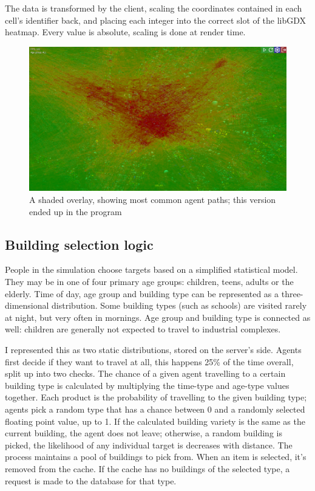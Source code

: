 The data is transformed by the client, scaling the coordinates contained in each cell's identifier back, and placing each integer into the correct slot of the libGDX heatmap. Every value is absolute, scaling is done at render time.
\begin{figure}[h]
    \centering
    \includegraphics[width=140mm, keepaspectratio]{images/overlay_v3.png}
    \caption{A shaded overlay, showing most common agent paths; this version ended up in the program\ \label{overlay_v3}}
\end{figure}

\subsection{Building selection logic}

People in the simulation choose targets based on a simplified statistical model. They may be in one of four primary age groups: children, teens, adults or the elderly. Time of day, age group and building type can be represented as a three-dimensional distribution. Some building types (such as schools) are visited rarely at night, but very often in mornings. Age group and building type is connected as well: children are generally not expected to travel to industrial complexes.

I represented this as two static distributions, stored on the server's side. Agents first decide if they want to travel at all, this happens 25\% of the time overall, split up into two checks. The chance of a given agent travelling to a certain building type is calculated by multiplying the time-type and age-type values together. Each product is the probability of travelling to the given building type; agents pick a random type that has a chance between 0 and a randomly selected floating point value, up to 1. If the calculated building variety is the same as the current building, the agent does not leave; otherwise, a random building is picked, the likelihood of any individual target is decreases with distance. The process maintains a pool of buildings to pick from. When an item is selected, it's removed from the cache. If the cache has no buildings of the selected type, a request is made to the database for that type.

